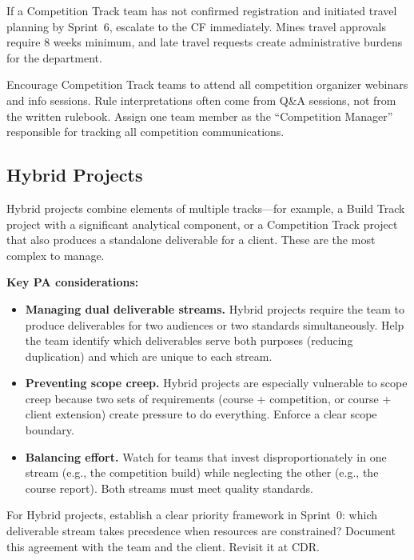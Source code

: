 \begin{paaction}
If a Competition Track team has not confirmed registration and initiated travel planning by Sprint~6, escalate to the CF immediately. Mines travel approvals require 8 weeks minimum, and late travel requests create administrative burdens for the department.
\end{paaction}

\begin{tipbox}
Encourage Competition Track teams to attend all competition organizer webinars and info sessions. Rule interpretations often come from Q\&A sessions, not from the written rulebook. Assign one team member as the ``Competition Manager'' responsible for tracking all competition communications.
\end{tipbox}

\subsection{Hybrid Projects}

Hybrid projects combine elements of multiple tracks---for example, a Build Track project with a significant analytical component, or a Competition Track project that also produces a standalone deliverable for a client. These are the most complex to manage.

\textbf{Key PA considerations:}

\begin{itemize}[nosep,leftmargin=1.5em]
\item \textbf{Managing dual deliverable streams.} Hybrid projects require the team to produce deliverables for two audiences or two standards simultaneously. Help the team identify which deliverables serve both purposes (reducing duplication) and which are unique to each stream.

\item \textbf{Preventing scope creep.} Hybrid projects are especially vulnerable to scope creep because two sets of requirements (course + competition, or course + client extension) create pressure to do everything. Enforce a clear scope boundary.

\item \textbf{Balancing effort.} Watch for teams that invest disproportionately in one stream (e.g., the competition build) while neglecting the other (e.g., the course report). Both streams must meet quality standards.
\end{itemize}

\begin{tipbox}
For Hybrid projects, establish a clear priority framework in Sprint~0: which deliverable stream takes precedence when resources are constrained? Document this agreement with the team and the client. Revisit it at CDR.
\end{tipbox}

